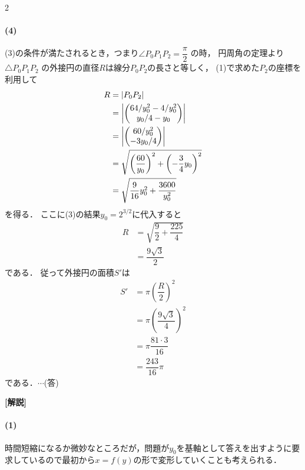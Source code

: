 \documentclass[../../main.tex]{subfiles}
\begin{document}
\begin{multicols}{2}
  \paragraph{(4)}
  (3)の条件が満たされるとき，つまり$\angle P_0 P_1 P_2 = \dfrac{\pi}{2}$ の時，
  円周角の定理より$\triangle P_0 P_1 P_2$ の外接円の直径$R$は線分$P_0P_2$の長さと等しく，
  (1)で求めた$P_2$の座標を利用して
  \begin{align}
    R
    & =  |P_0 P_2|                                                    \\
    & =  \left|\mqty(64/y_0^2-4/y_0^2                                          \\ y_0/4 - y_0)\right| \\
    & =  \left|\mqty(60/y_0^2                                                  \\ -3y_0/4 )\right| \\
    & = \sqrt{\left(\dfrac{60}{y_0}\right)^2 + \left(-\dfrac{3}{4}y_0\right)^2 } \\
    & = \sqrt{\dfrac{9}{16}y_0^2 + \dfrac{3600}{y_0^2}}
  \end{align}
  を得る．
  ここに(3)の結果$y_0=2^{3/2}$に代入すると
  \begin{align}
    R
    & = \sqrt{\dfrac{9}{2}+\dfrac{225}{4}} \\
    & = \dfrac{9\sqrt{3}}{2}
  \end{align}
  である．
  従って外接円の面積$S'$は
  \begin{align}
    S'
    & = \pi \left(\dfrac{R}{2}\right)^2         \\
    & = \pi \left(\dfrac{9\sqrt{3}}{4}\right)^2 \\
    & = \pi \dfrac{81 \cdot 3}{16}              \\
    & = \dfrac{243}{16}\pi
  \end{align}
  である．$\cdots$(答)

  {\bf [解説]}
  \paragraph{(1)}
  時間短縮になるか微妙なところだが，問題が$y_0$を基軸として答えを出すように要求しているので最初から$x=f(y)$の形で変形していくことも考えられる．


\end{multicols}
\end{document}
